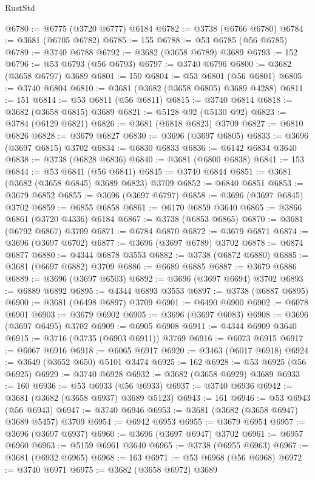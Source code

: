 \begin{lexlean}{RustStd}
\begin{coremodule}
@6780 := @6775 (@3720 @6777) @6184
@6782 := @3738 (@6766 @6780)
@6784 := @3681 (@6705 @6782)
@6785 := 155
@6788 := @53 @6785 (@56 @6785)
@6789 := @3740 @6788
@6792 := @3682 (@3658 @6789) @3689
@6793 := 152
@6796 := @53 @6793 (@56 @6793)
@6797 := @3740 @6796
@6800 := @3682 (@3658 @6797) @3689
@6801 := 150
@6804 := @53 @6801 (@56 @6801)
@6805 := @3740 @6804
@6810 := @3681 (@3682 (@3658 @6805) @3689 @4288)
@6811 := 151
@6814 := @53 @6811 (@56 @6811)
@6815 := @3740 @6814
@6818 := @3682 (@3658 @6815) @3689
@6821 := @5128 @92 (@5130 @92)
@6823 := @3784 (@6129 @6821)
@6826 := @3681 (@6818 @6823) @3709
@6827 := @6810 @6826
@6828 := @3679 @6827
@6830 := @3696 (@3697 @6805)
@6833 := @3696 (@3697 @6815) @3702
@6834 := @6830 @6833
@6836 := @6142 @6834 @3640
@6838 := @3738 (@6828 @6836)
@6840 := @3681 (@6800 @6838)
@6841 := 153
@6844 := @53 @6841 (@56 @6841)
@6845 := @3740 @6844
@6851 := @3681 (@3682 (@3658 @6845) @3689 @6823) @3709
@6852 := @6840 @6851
@6853 := @3679 @6852
@6855 := @3696 (@3697 @6797)
@6858 := @3696 (@3697 @6845) @3702
@6859 := @6855 @6858
@6861 := @6170 @6859 @3640
@6865 := @3866 @6861 (@3720 @4336) @6184
@6867 := @3738 (@6853 @6865)
@6870 := @3681 (@6792 @6867) @3709
@6871 := @6784 @6870
@6872 := @3679 @6871
@6874 := @3696 (@3697 @6702)
@6877 := @3696 (@3697 @6789) @3702
@6878 := @6874 @6877
@6880 := @4344 @6878 @3553
@6882 := @3738 (@6872 @6880)
@6885 := @3681 (@6697 @6882) @3709
@6886 := @6689 @6885
@6887 := @3679 @6886
@6889 := @3696 (@3697 @6503)
@6892 := @3696 (@3697 @6694) @3702
@6893 := @6889 @6892
@6895 := @4344 @6893 @3553
@6897 := @3738 (@6887 @6895)
@6900 := @3681 (@6498 @6897) @3709
@6901 := @6490 @6900
@6902 := @6078 @6901
@6903 := @3679 @6902
@6905 := @3696 (@3697 @6083)
@6908 := @3696 (@3697 @6495) @3702
@6909 := @6905 @6908
@6911 := @4344 @6909 @3640
@6915 := @3716 (@3735 (@6903 @6911)) @3769
@6916 := @6073 @6915
@6917 := @6067 @6916
@6918 := @6065 @6917
@6920 := @3463 (@6017 @6918)
@6924 := @3649 (@3652 @650) @5101 @3474
@6925 := 162
@6928 := @53 @6925 (@56 @6925)
@6929 := @3740 @6928
@6932 := @3682 (@3658 @6929) @3689
@6933 := 160
@6936 := @53 @6933 (@56 @6933)
@6937 := @3740 @6936
@6942 := @3681 (@3682 (@3658 @6937) @3689 @5123)
@6943 := 161
@6946 := @53 @6943 (@56 @6943)
@6947 := @3740 @6946
@6953 := @3681 (@3682 (@3658 @6947) @3689 @5457) @3709
@6954 := @6942 @6953
@6955 := @3679 @6954
@6957 := @3696 (@3697 @6937)
@6960 := @3696 (@3697 @6947) @3702
@6961 := @6957 @6960
@6963 := @5159 @6961 @3640
@6965 := @3738 (@6955 @6963)
@6967 := @3681 (@6932 @6965)
@6968 := 163
@6971 := @53 @6968 (@56 @6968)
@6972 := @3740 @6971
@6975 := @3682 (@3658 @6972) @3689

\end{coremodule}
\end{lexlean}
